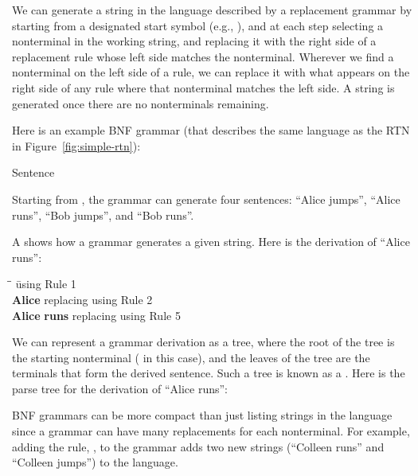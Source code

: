 We can generate a string in the language described by a replacement grammar by starting from a designated start symbol (e.g., ), and at each step selecting a nonterminal in the working string, and replacing it with the right side of a replacement rule whose left side matches the nonterminal.  Wherever we find a nonterminal on the left side of a rule, we can replace it with what appears on the right side of any rule where that nonterminal matches the left side.  A string is generated once there are no nonterminals remaining.

Here is an example BNF grammar (that describes the same language as the RTN in Figure~\ref{fig:simple-rtn}):
\begin{bnfgrammarmn}{Sentence}
\end{bnfgrammarmn}
Starting from , the grammar can generate four sentences: ``Alice jumps'', ``Alice runs'', ``Bob jumps'', and ``Bob runs''.  

A  shows how a grammar generates a given string.  Here is the derivation of ``Alice runs'':
\begin{smallquote}
\begin{tabbing}
 \= \produces \=  \hspace*{6em}\=using Rule 1\\
\> \produces \= {\bf Alice}  \> replacing  using Rule 2\\
\> \produces \= {\bf Alice} {\bf runs} \>	replacing  using Rule 5\\
\end{tabbing}
\end{smallquote}
We can represent a grammar derivation as a tree, where the root of the tree is the starting nonterminal ( in this case), and the leaves of the tree are the terminals that form the derived sentence.  Such a tree is known as a .  Here is the parse tree for the derivation of ``Alice runs'':
\begin{center}
\end{center}
BNF grammars can be more compact than just listing strings in the language since a grammar can have many replacements for each nonterminal.  For example, adding the rule, , to the grammar adds two new strings (``Colleen runs'' and ``Colleen jumps'') to the language.  

